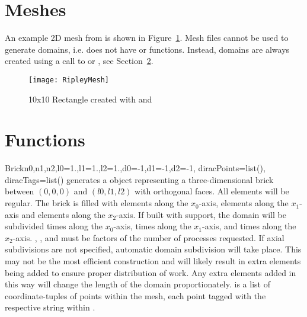 \section{Meshes}
\label{sec:ripleymeshes}
An example 2D mesh from \ripley is shown in Figure~\ref{fig:ripleyrect}.
Mesh files cannot be used to generate \ripley domains, i.e. \ripley does not
have  or  functions.
Instead, \ripley domains are always created using a call to 
or , see Section~\ref{sec:ripleyfuncs}.

\begin{figure}
\centerline{\texttt{[image: RipleyMesh]}}
\caption{10x10 \ripley Rectangle created with  and
}
\label{fig:ripleyrect}
\end{figure}

\section{Functions}\label{sec:ripleyfuncs}
\begin{funcdesc}{Brick}{n0,n1,n2,l0=1.,l1=1.,l2=1.,d0=-1,d1=-1,d2=-1,
diracPoints=list(), diracTags=list()}
generates a \Domain object representing a three-dimensional brick between
$(0,0,0)$ and $(l0,l1,l2)$ with orthogonal faces. All elements will be regular.
The brick is filled with
 elements along the $x_0$-axis,
 elements along the $x_1$-axis and
 elements along the $x_2$-axis.
If built with \MPI support, the domain will be subdivided 
 times along the $x_0$-axis,
 times along the $x_1$-axis, and
 times along the $x_2$-axis.
, , and  must be factors of the number of
\MPI processes requested.
If axial subdivisions are not specified, automatic domain subdivision will take
place. This may not be the most efficient construction and will likely result in
extra elements being added to ensure proper distribution of work. Any extra
elements added in this way will change the length of the domain proportionately.
 is a list of coordinate-tuples of points within the mesh,
each point tagged with the respective string within .
\end{funcdesc}

